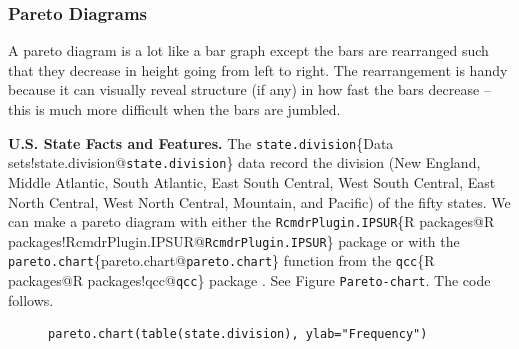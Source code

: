 \documentclass[10pt,english]{scrbook}
\begin{document}
\subsubsection[Pareto Diagrams]{Pareto Diagrams}
\label{sec-1-1-4-3}

A pareto diagram is a lot like a bar graph except the bars are rearranged such that they decrease in height going from left to right. The rearrangement is handy because it can visually reveal structure (if any) in how fast the bars decrease -- this is much more difficult when the bars are jumbled. 

\begin{exampletoo}

\textbf{U.S. State Facts and Features.} The \texttt{state.division}\index\{Data sets!state.division@\texttt{state.division}\} data record the division (New England, Middle Atlantic, South Atlantic, East South Central, West South Central, East North Central, West North Central, Mountain, and Pacific) of the fifty states. We can make a pareto diagram with either the \texttt{RcmdrPlugin.IPSUR}\index\{R packages@\textsf{R} packages!RcmdrPlugin.IPSUR@\texttt{RcmdrPlugin.IPSUR}\} package \cite{RcmdrPlugin.IPSUR} or with the \texttt{pareto.chart}\index\{pareto.chart@\texttt{pareto.chart}\} function from the \texttt{qcc}\index\{R packages@\textsf{R} packages!qcc@\texttt{qcc}\} package \cite{qcc}. See Figure \texttt{Pareto-chart}. The code follows.

\begin{figure}[H]
\label{Pareto-chart}
\begin{verbatim}
pareto.chart(table(state.division), ylab="Frequency")
\end{verbatim}
\end{figure}


\end{exampletoo}
\end{document}
